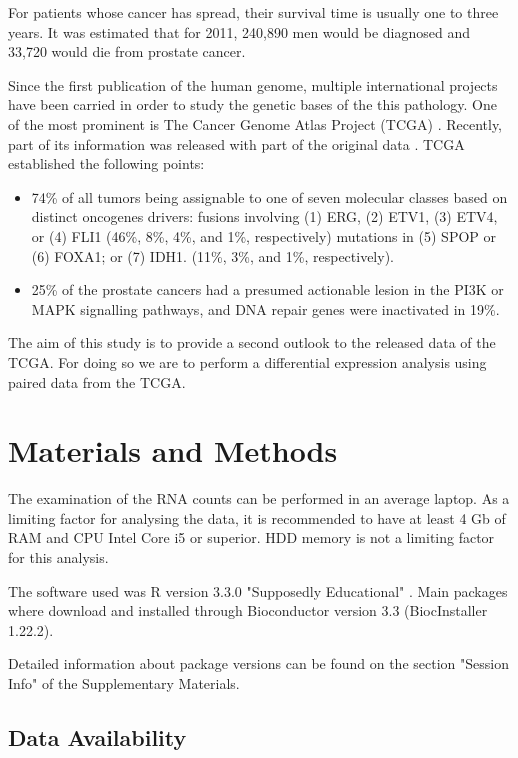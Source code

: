 \documentclass[9pt,twocolumn,twoside]{gsajnl}
\begin{document}
For patients whose cancer has spread, their survival time is usually one to three years. It was estimated that for 2011, 240,890 men would be diagnosed and 33,720 would die from prostate cancer.


Since the first publication of the human genome, multiple international projects have been carried in order to study the genetic bases of the this pathology. One of the most prominent is The Cancer Genome Atlas Project (TCGA) \citep{tgca}. Recently, part of its information was released with part of the original data \cite{Rahman15112015}. TCGA established the following points:

\begin{itemize}
\item 74\% of all tumors being assignable to one of seven molecular classes based on distinct oncogenes drivers:
        fusions involving (1) ERG, (2) ETV1, (3) ETV4, or (4) FLI1 (46\%, 8\%, 4\%, and 1\%, respectively)
        mutations in (5) SPOP or (6) FOXA1; or (7) IDH1. (11\%, 3\%, and 1\%, respectively).
\item 25\% of the prostate cancers had a presumed actionable lesion in the PI3K or MAPK signalling pathways, and DNA repair genes were inactivated in 19\%.
\end{itemize}
   
    
The aim of this study is to provide a second outlook to the released data of the TCGA. For doing so we are to perform a differential expression analysis using paired data from the TCGA.

\section*{Materials and Methods}
The examination of the RNA counts can be performed in an average laptop. As a limiting factor for analysing the data, it is recommended to have at least 4 Gb of RAM and CPU Intel Core i5 or superior. HDD memory is not a limiting factor for this analysis.

The software used was R version 3.3.0 "Supposedly Educational" \cite{R}. Main packages where download and installed through Bioconductor version 3.3 (BiocInstaller 1.22.2)\cite{bioconductor}.

Detailed information about package versions can be found on the section "Session Info" of the Supplementary Materials.

\subsection*{Data Availability}
\end{document}
